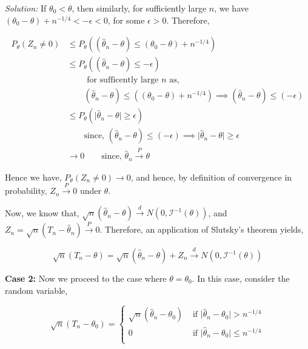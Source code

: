 \documentclass[12pt]{article}
\theoremstyle{definition}
\newenvironment{answer}{\textit{Solution: }\quad }{ \hfill \qedsymbol}
\begin{document}
\begin{answer}
	If $\theta_0 < \theta$, then similarly, for sufficiently large $n$, we have $(\theta_0 - \theta) + n^{-1/4} < -\epsilon < 0$, for some $\epsilon > 0$. Therefore,

	\begin{align*}
		P_{\theta} (Z_n \neq 0) 
		& \leq P_{\theta} \left( (\widehat{\theta}_n - \theta) \leq (\theta_0 - \theta) + n^{-1/4} \right)\\
		& \leq P_{\theta} \left( (\widehat{\theta}_n - \theta) \leq -\epsilon \right)\\
		& \qquad \text{ for sufficently large } n \text{ as, }\\
		& \qquad (\widehat{\theta}_n - \theta) \leq ((\theta_0 - \theta) + n^{-1/4}) \implies (\widehat{\theta}_n - \theta) \leq (-\epsilon)\\
		& \leq P_{\theta} \left(\vert \widehat{\theta}_n - \theta \vert \geq \epsilon \right)\\
		& \qquad \text{since, } (\widehat{\theta}_n - \theta) \leq (-\epsilon) \implies \vert \widehat{\theta}_n - \theta \vert \geq \epsilon\\
		& \rightarrow 0 \qquad \text{since, } \widehat{\theta}_n \xrightarrow{P} \theta
	\end{align*}

	Hence we have, $P_{\theta}(Z_n \neq 0) \rightarrow 0$, and hence, by definition of convergence in probability, $Z_n \xrightarrow{P} 0$ under $\theta$. 
	
	Now, we know that, $\sqrt{n}(\widehat{\theta}_n - \theta) \xrightarrow{d} N(0, \mathcal{I}^{-1}(\theta))$, and $Z_n = \sqrt{n}(T_n - \widehat{\theta}_n) \xrightarrow{P} 0$. Therefore, an application of Slutsky's theorem yields,

	\begin{equation}
		\sqrt{n}(T_n - \theta) = \sqrt{n}(\widehat{\theta}_n - \theta) + Z_n \xrightarrow{d} N(0, \mathcal{I}^{-1}(\theta))
		\label{eqn:4-case1}
	\end{equation}


	\textbf{Case 2: } Now we proceed to the case where $\theta = \theta_0$. In this case, consider the random variable,

	$$\sqrt{n}(T_n - \theta_0) = \begin{cases}
		\sqrt{n} (\widehat{\theta}_n - \theta_0) & \text{ if } \vert \widehat{\theta}_n - \theta_0 \vert > n^{-1/4}\\
		0 & \text{ if } \vert \widehat{\theta}_n - \theta_0 \vert \leq n^{-1/4}\\
	\end{cases}
	$$


\end{answer}
\end{document}
